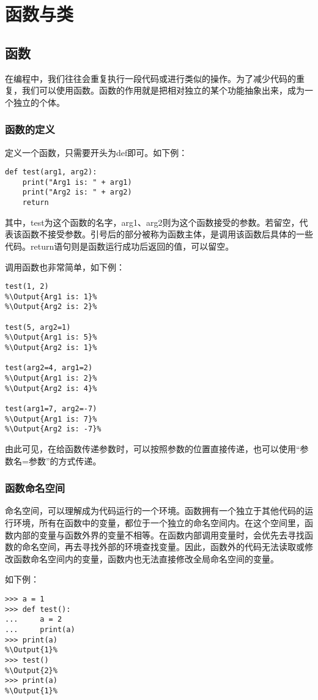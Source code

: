 \documentclass[../../Main.tex]{subfiles}
\begin{document}
\section{函数与类\PyOnly }

\subsection{函数}
在编程中，我们往往会重复执行一段代码或进行类似的操作。为了减少代码的重复，我们可以使用函数。函数的作用就是把相对独立的某个功能抽象出来，成为一个独立的个体。

\subsubsection{函数的定义}
定义一个函数，只需要开头为def即可。如下例：
\begin{lstlisting}
def test(arg1, arg2):
    print("Arg1 is: " + arg1)
    print("Arg2 is: " + arg2)
    return
\end{lstlisting}

其中，test为这个函数的名字，arg1、arg2则为这个函数接受的参数。若留空，代表该函数不接受参数。引号后的部分被称为函数主体，是调用该函数后具体的一些代码。return语句则是函数运行成功后返回的值，可以留空。

调用函数也非常简单，如下例：
\begin{lstlisting}
test(1, 2)
%\Output{Arg1 is: 1}%
%\Output{Arg2 is: 2}%

test(5, arg2=1)
%\Output{Arg1 is: 5}%
%\Output{Arg2 is: 1}%

test(arg2=4, arg1=2)
%\Output{Arg1 is: 2}%
%\Output{Arg2 is: 4}%

test(arg1=7, arg2=-7)
%\Output{Arg1 is: 7}%
%\Output{Arg2 is: -7}%
\end{lstlisting}

由此可见，在给函数传递参数时，可以按照参数的位置直接传递，也可以使用“参数名=参数”的方式传递。

\subsubsection{函数命名空间}
命名空间，可以理解成为代码运行的一个环境。函数拥有一个独立于其他代码的运行环境，所有在函数中的变量，都位于一个独立的命名空间内。在这个空间里，函数内部的变量与函数外界的变量不相等。在函数内部调用变量时，会优先去寻找函数的命名空间，再去寻找外部的环境查找变量。因此，函数外的代码无法读取或修改函数命名空间内的变量，函数内也无法直接修改全局命名空间的变量。

如下例：
\begin{lstlisting}
>>> a = 1
>>> def test():
...     a = 2
...     print(a)
>>> print(a)
%\Output{1}%
>>> test()
%\Output{2}%
>>> print(a)
%\Output{1}%
\end{lstlisting}
\end{document}
